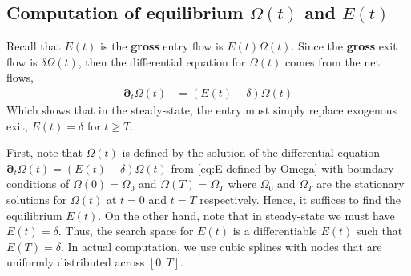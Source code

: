 \documentclass[11pt]{article}
\newcommand{\D}[1][]{\ensuremath{\boldsymbol{\partial}_{#1}}}
\newcommand{\diff}{\ensuremath{\mathrm{d}}}
\begin{document}


\subsection{Computation of equilibrium $\Omega(t)$ and $E(t)$}\label{sec:Omega-E}


Recall that $E(t)$ is the \textbf{gross} entry flow is $E(t)\Omega(t)$.  Since the \textbf{gross} exit flow is $\delta \Omega(t)$, then the differential equation for $\Omega(t)$ comes from the net flows,
\begin{align} 
	\D[t] \Omega(t) &= \left(E(t) - \delta \right)\Omega(t)\label{eq:E-defined-by-Omega}
\end{align}
Which shows that in the steady-state, the entry must simply replace exogenous exit, $E(t) = \delta$ for $t \geq T$.

First, note that $\Omega(t)$ is defined by the solution of the differential equation $	\D[t] \Omega(t) = \left(E(t) - \delta \right)\Omega(t)$ from \cref{eq:E-defined-by-Omega} with boundary conditions of $\Omega(0) = \Omega_0$ and $\Omega(T) = \Omega_T$ where $\Omega_0$ and $\Omega_T$ are the stationary solutions for $\Omega(t)$ at $t = 0$ and $t = T$ respectively. Hence, it suffices to find the equilibrium $E(t)$. On the other hand, note that in steady-state we must have $E(t) = \delta$. Thus, the search space for $E(t)$ is a differentiable $E(t)$ such that $E(T) = \delta$. In actual computation, we use cubic splines with nodes that are uniformly distributed across $[0,T]$.
\end{document}
